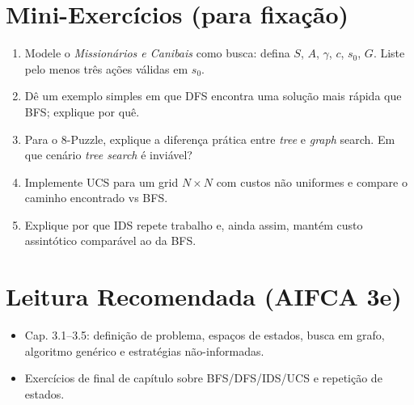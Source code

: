 \documentclass[9pt,a4paper]{extarticle}
\begin{document}
\section*{Mini-Exercícios (para fixação)}
\begin{enumerate}
  \item Modele o \textit{Missionários e Canibais} como busca: defina $S$, $A$, $\gamma$, $c$, $s_0$, $G$. Liste pelo menos três ações válidas em $s_0$.
  \item Dê um exemplo simples em que DFS encontra uma solução mais rápida que BFS; explique por quê.
  \item Para o 8-Puzzle, explique a diferença prática entre \textit{tree} e \textit{graph} search. Em que cenário \textit{tree search} é inviável?
  \item Implemente UCS para um grid $N\times N$ com custos não uniformes e compare o caminho encontrado vs BFS.
  \item Explique por que IDS repete trabalho e, ainda assim, mantém custo assintótico comparável ao da BFS.
\end{enumerate}

\section*{Leitura Recomendada (AIFCA 3e)}
\begin{itemize}
  \item Cap. 3.1--3.5: definição de problema, espaços de estados, busca em grafo, algoritmo genérico e estratégias não-informadas.
  \item Exercícios de final de capítulo sobre BFS/DFS/IDS/UCS e repetição de estados.
\end{itemize}
\end{document}
